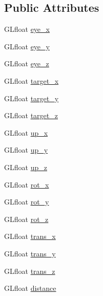 \subsection*{Public Attributes}
\begin{DoxyCompactItemize}
\item 
G\-Lfloat \hyperlink{class_d_k_frame_base_ab782d93ca41b990fe19be978489e1007}{eye\-\_\-x}
\item 
G\-Lfloat \hyperlink{class_d_k_frame_base_a0415158ce23c3d20be159b06189f2280}{eye\-\_\-y}
\item 
G\-Lfloat \hyperlink{class_d_k_frame_base_a2c3b8d4c7a8fecbede7bc53fc094bb76}{eye\-\_\-z}
\item 
G\-Lfloat \hyperlink{class_d_k_frame_base_a247faec4bb98b2301bfe7f325d705e74}{target\-\_\-x}
\item 
G\-Lfloat \hyperlink{class_d_k_frame_base_ad13420ad05123eb9f90c223aff993a5d}{target\-\_\-y}
\item 
G\-Lfloat \hyperlink{class_d_k_frame_base_a8184b7d5b27b30191a3756e0f230779f}{target\-\_\-z}
\item 
G\-Lfloat \hyperlink{class_d_k_frame_base_a3ba70eafaa79651e56270f77999128e2}{up\-\_\-x}
\item 
G\-Lfloat \hyperlink{class_d_k_frame_base_abb7dacc641c090770a862eccc74a47d1}{up\-\_\-y}
\item 
G\-Lfloat \hyperlink{class_d_k_frame_base_a1c567a462b7fd9e10f23ff1ea5166ff0}{up\-\_\-z}
\item 
G\-Lfloat \hyperlink{class_d_k_frame_base_a80c9d5a227d6e49d53b43e21fb710460}{rot\-\_\-x}
\item 
G\-Lfloat \hyperlink{class_d_k_frame_base_aed41338ec79b643f3efa9c9bc31973b7}{rot\-\_\-y}
\item 
G\-Lfloat \hyperlink{class_d_k_frame_base_a603cbf43fc361c8014b97e752f503480}{rot\-\_\-z}
\item 
G\-Lfloat \hyperlink{class_d_k_frame_base_aa8c892f5ccee79464e2ead69b78b980e}{trans\-\_\-x}
\item 
G\-Lfloat \hyperlink{class_d_k_frame_base_a83a5b6532f68dd45eae77ada8c712eab}{trans\-\_\-y}
\item 
G\-Lfloat \hyperlink{class_d_k_frame_base_a61bca9d1a0f825d9e36f81ee33c0ef08}{trans\-\_\-z}
\item 
G\-Lfloat \hyperlink{class_d_k_frame_base_a1f2f30203b6f7aa9dc98a2c4ea7588eb}{distance}
\end{DoxyCompactItemize}


